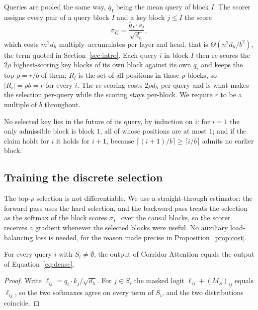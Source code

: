 Queries are pooled the same way, $\bar{q}_I$ being the mean query of block
$I$. The scorer assigns every pair of a query block $I$ and a key block
$j \le I$ the score
\begin{equation}\label{eq:score}
  \sigma_{Ij} = \frac{\bar{q}_I \cdot s_j}{\sqrt{d_h}} ,
\end{equation}
which costs $m^2 d_h$ multiply--accumulates per layer and head, that is
$\Theta(n^2 d_h / b^2)$, the term quoted in Section~\ref{sec:intro}. Each
query $i$ in block $I$ then re-scores the $2\rho$ highest-scoring key blocks
of its own block against its own $q_i$ and keeps the top $\rho = r/b$ of
them; $R_i$ is the set of all positions in those $\rho$ blocks, so
$|R_i| = \rho b = r$ for every $i$. The re-scoring costs $2\rho d_h$ per
query and is what makes the selection per-query while the scoring stays
per-block. We require $r$ to be a multiple of $b$ throughout.

No selected key lies in the future of its query, by induction on $i$: for
$i = 1$ the only admissible block is block $1$, all of whose positions are
at most $1$; and if the claim holds for $i$ it holds for $i + 1$, because
$\lceil (i+1)/b \rceil \ge \lceil i/b \rceil$ admits no earlier block.

\subsection{Training the discrete selection}\label{sec:training}

The top-$\rho$ selection is not differentiable. We use a straight-through
estimator: the forward pass uses the hard selection, and the backward pass
treats the selection as the softmax of the block scores $\sigma_{I\cdot}$
over the causal blocks, so the scorer receives a gradient whenever the
selected blocks were useful. No auxiliary load-balancing loss is needed, for
the reason made precise in Proposition~\ref{prop:cost}.

\begin{lemma}[Exactness]\label{lem:exact}
For every query $i$ with $S_i \ne \emptyset$, the output of Corridor
Attention equals the output of Equation~\eqref{eq:dense}.
\end{lemma}
\begin{proof}
Write $\ell_{ij} = q_i \cdot k_j / \sqrt{d_h}$. For $j \in S_i$ the masked
logit $\ell_{ij} + (M_S)_{ij}$ equals $\ell_{ij}$, so the two softmaxes
agree on every term of $S_i$, and the two distributions coincide.
\end{proof}


